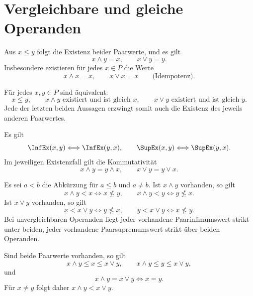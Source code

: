 \section{Vergleichbare und gleiche Operanden}

\begin{theorem}
\label{b14guide:thm:comparable}
Aus $x\leq y$ folgt die Existenz beider Paarwerte, und es gilt
\[
 x\wedge y=x,\qquad x\vee y=y.
\]
Insbesondere existieren für jedes $x\in P$ die Werte
\[
 x\wedge x=x,\qquad x\vee x=x
 \qquad\text{(Idempotenz).}
\]
\end{theorem}

\begin{theorem}
\label{b14guide:thm:order}
Für jedes $x,y\in P$ sind äquivalent:
\[
 x\leq y,\qquad
 x\wedge y\text{ existiert und ist gleich }x,\qquad
 x\vee y\text{ existiert und ist gleich }y.
\]
Jede der letzten beiden Aussagen erzwingt somit auch die
Existenz des jeweils anderen Paarwertes.
\end{theorem}

\begin{theorem}
\label{b14guide:thm:commutative}
Es gilt
\[
 \InfEx(x,y)\Longleftrightarrow\InfEx(y,x),\qquad
 \SupEx(x,y)\Longleftrightarrow\SupEx(y,x).
\]
Im jeweiligen Existenzfall gilt die Kommutativität
\[
 x\wedge y=y\wedge x,\qquad x\vee y=y\vee x.
\]
\end{theorem}

\begin{theorem}
\label{b14guide:thm:strict}
Es sei $a<b$ die Abkürzung für $a\leq b$ und $a\ne b$.
Ist $x\wedge y$ vorhanden, so gilt
\[
 x\wedge y<x\Longleftrightarrow x\not\leq y,\qquad
 x\wedge y<y\Longleftrightarrow y\not\leq x.
\]
Ist $x\vee y$ vorhanden, so gilt
\[
 x<x\vee y\Longleftrightarrow y\not\leq x,\qquad
 y<x\vee y\Longleftrightarrow x\not\leq y.
\]
Bei unvergleichbaren Operanden liegt jeder vorhandene
Paarinfimumswert strikt unter beiden, jeder vorhandene
Paarsupremumswert strikt über beiden Operanden.
\end{theorem}

\begin{theorem}
\label{b14guide:thm:coincidence}
Sind beide Paarwerte vorhanden, so gilt
\[
 x\wedge y\leq x\leq x\vee y,\qquad
 x\wedge y\leq y\leq x\vee y,
\]
und
\[
 x\wedge y=x\vee y\Longleftrightarrow x=y.
\]
Für $x\ne y$ folgt daher $x\wedge y<x\vee y$.
\end{theorem}